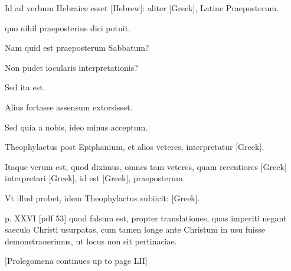 \begin{parnumbers}
Id ad verbum
Hebraice esset \texthebrew{[Hebrew]}:
 aliter \textgreek{[Greek]}, Latine Praeposterum.

quo nihil praeposterius dici potuit.

Nam quid est praeposterum Sabbatum?

Non pudet iocularis interpretationis?

Sed ita est.

Alius fortasse assensum extorsisset.

Sed quia a nobis, ideo
minus acceptum.

Theophylactus post Epiphanium, et alios veteres,
interpretatur \textgreek{[Greek]}.

Itaque verum est, quod diximus, omnes tam veteres, quam
recentiores \textgreek{[Greek]} interpretari
 \textgreek{[Greek]}, id est \textgreek{[Greek]},
praeposterum.

Vt illud probet, idem Theophylactus
subiicit: \textgreek{[Greek]}.

\clearpage
p. XXVI [pdf 53]
quod falsum est,
propter translationes, quas imperiti negant saeculo Christi usurpatas,
cum tamen longe ante Christum in usu fuisse demonstrauerimus,
ut locus non sit pertinaciae.

[Prolegomena continues up to page LII]

\end{parnumbers}
